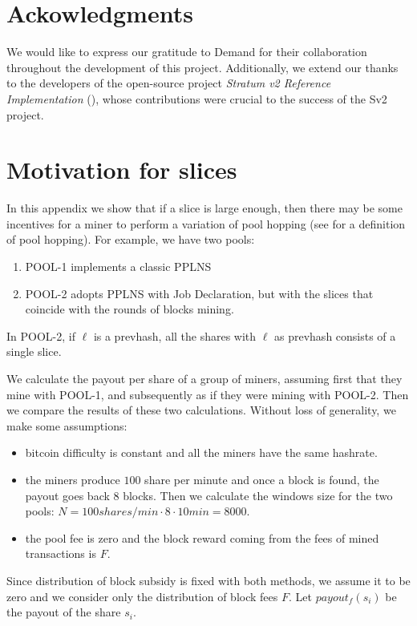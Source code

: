 \documentclass[11pt]{article}
\begin{document}
\section{Ackowledgments}
We would like to express our gratitude to Demand \cite{demand} for their collaboration throughout the development of this project. Additionally, we extend our thanks to the developers of the open-source project \emph{Stratum v2 Reference Implementation} (\cite{sv2}), whose contributions were crucial to the success of the Sv2 project.


\appendix
\section{Motivation for slices}
In this appendix we show that if a slice is large enough, then there may be some incentives for a miner to perform a variation of pool hopping (see \cite{rosenfeld} for a definition of pool hopping). For example, we have two pools:
\begin{enumerate}
	\item POOL-1 implements a classic PPLNS
	\item POOL-2 adopts PPLNS with Job Declaration, but with the slices that coincide with the rounds of blocks mining.
\end{enumerate}
In POOL-2, if $\ell$ is a prevhash, all the shares with $\ell$ as prevhash consists of a single slice.

We calculate the payout per share of a group of miners, assuming first that they mine with POOL-1, and subsequently as if they were mining with POOL-2. Then we compare the results of these two calculations. Without loss of generality, we make some assumptions:
\begin{itemize}
	\item bitcoin difficulty is constant and all the miners have the same hashrate.
	\item the miners produce $100$ share per minute and once a block is found, the payout goes back $8$ blocks. Then we calculate the windows size for the two pools: $N = 100 shares/min \cdot 8 \cdot 10min = 8000$.
	\item the pool fee is zero and the block reward coming from the fees of mined transactions is $F$.

\end{itemize}
Since distribution of block subsidy is fixed with both methods, we assume it to be zero and we consider only the distribution of block fees $F$.
Let $payout_f(s_i)$ be the payout of the share $s_i$.
\end{document}
